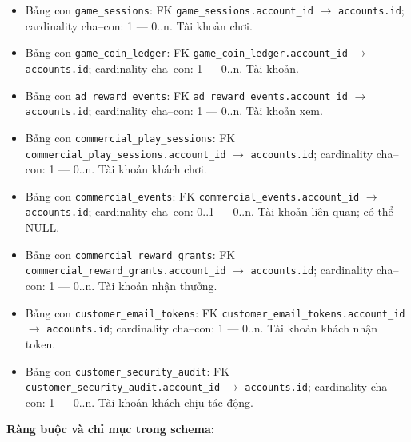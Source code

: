 \begin{itemize}
\item Bảng con \texttt{game\_sessions}: FK \texttt{game\_sessions.account\_id} $\rightarrow$ \texttt{accounts.id}; cardinality cha--con: 1 — 0..n. Tài khoản chơi.

\item Bảng con \texttt{game\_coin\_ledger}: FK \texttt{game\_coin\_ledger.account\_id} $\rightarrow$ \texttt{accounts.id}; cardinality cha--con: 1 — 0..n. Tài khoản.

\item Bảng con \texttt{ad\_reward\_events}: FK \texttt{ad\_reward\_events.account\_id} $\rightarrow$ \texttt{accounts.id}; cardinality cha--con: 1 — 0..n. Tài khoản xem.

\item Bảng con \texttt{commercial\_play\_sessions}: FK \texttt{commercial\_play\_sessions.account\_id} $\rightarrow$ \texttt{accounts.id}; cardinality cha--con: 1 — 0..n. Tài khoản khách chơi.

\item Bảng con \texttt{commercial\_events}: FK \texttt{commercial\_events.account\_id} $\rightarrow$ \texttt{accounts.id}; cardinality cha--con: 0..1 — 0..n. Tài khoản liên quan; có thể NULL.

\item Bảng con \texttt{commercial\_reward\_grants}: FK \texttt{commercial\_reward\_grants.account\_id} $\rightarrow$ \texttt{accounts.id}; cardinality cha--con: 1 — 0..n. Tài khoản nhận thưởng.

\item Bảng con \texttt{customer\_email\_tokens}: FK \texttt{customer\_email\_tokens.account\_id} $\rightarrow$ \texttt{accounts.id}; cardinality cha--con: 1 — 0..n. Tài khoản khách nhận token.

\item Bảng con \texttt{customer\_security\_audit}: FK \texttt{customer\_security\_audit.account\_id} $\rightarrow$ \texttt{accounts.id}; cardinality cha--con: 1 — 0..n. Tài khoản khách chịu tác động.

\end{itemize}

\textbf{Ràng buộc và chỉ mục trong schema:}

